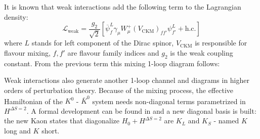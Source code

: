 \documentclass[english, LaM, oneside, noexaminfo]{sapthesis}
\newcommand{\kkb}{$K^0$ - $\bar K^0$ }
\begin{document}
It is known that weak interactions add the following term to the Lagrangian density:
\begin{equation}
    \mathcal{L}_{\text{weak}} = \frac{g_2}{\sqrt{2}} \left[ \overline \psi^L_f \gamma_\mu W^{+}_\mu (V_{\text{CKM}})_{ff'} \psi^L_{f'} + \text{h.c.} \right]
\end{equation}
where $L$ stands for left component of the Dirac spinor, $V_{\text{CKM}}$ is responsible for flavour mixing, $f,f'$ are flavour family indices and $g_2$ is the weak coupling constant.
From the previous term this mixing 1-loop diagram follows:
\begin{center}
\end{center}
Weak interactions also generate another 1-loop channel and diagrams in higher orders of perturbation theory.
Because of the mixing process, the effective Hamiltonian of the \kkb system needs non-diagonal terms parametrized in $H^{\Delta S = 2}$.
A formal development can be found in \cite{Donoghue} and a new diagonal basis is built: the new Kaon states that diagonalize $H_0 + H^{\Delta S = 2}$ are $K_{L}$ and $K_{S}$ - named $K$ long and $K$ short.
\end{document}
